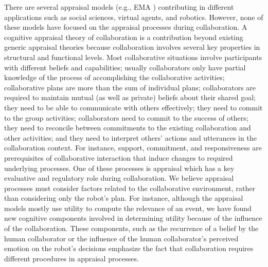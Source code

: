 There are several appraisal models (e.g., EMA \cite{marsella:ema-process-model})
contributing in different applications such as social sciences, virtual agents,
and robotics. However, none of these models have focused on the appraisal
processes during collaboration. A cognitive appraisal theory of collaboration is
a contribution beyond existing generic appraisal theories because collaboration
involves several key properties in structural and functional levels. Most
collaborative situations involve participants with different beliefs and
capabilities; usually collaborators only have partial knowledge of the process
of accomplishing the collaborative activities; collaborative plans are more than
the sum of individual plans; collaborators are required to maintain mutual (as
well as private) beliefs about their shared goal; they need to be able to
communicate with others effectively; they need to commit to the group
activities; collaborators need to commit to the success of others; they need to
reconcile between commitments to the existing collaboration and other
activities; and they need to interpret others’ actions and utterances in the
collaboration context. For instance, support, commitment, and responsiveness are
prerequisites of collaborative interaction that induce changes to required
underlying processes. One of these processes is appraisal which has a key
evaluative and regulatory role during collaboration. We believe appraisal
processes must consider factors related to the collaborative environment, rather
than considering only the robot's plan. For instance, although the appraisal
models mostly use utility to compute the relevance of an event, we have found
new cognitive components involved in determining utility because of the
influence of the collaboration. These components, such as the recurrence of a
belief by the human collaborator or the influence of the human collaborator's
perceived emotion on the robot's decisions emphasize the fact that collaboration
requires different procedures in appraisal processes.


